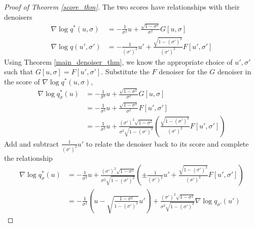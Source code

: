 \documentclass[11pt]{article}
\theoremstyle{proposition}
\theoremstyle{lemma}
\theoremstyle{corollary}
\theoremstyle{theorem}
\theoremstyle{definition}
\begin{document}
\begin{proof}[Proof of Theorem \ref{score_thm}]
The two scores have relationships with their denoisers
\begin{align*}
\nabla \log q^{*}(u,\sigma)&= - \frac{1}{\sigma^{2}}u+\frac{\sqrt{1-\sigma^{2}}}{\sigma^{2}}G[u,\sigma]\\
\nabla \log q(u',\sigma')&= - \frac{1}{(\sigma')^{2}}u'+\frac{\sqrt{1-(\sigma')^{2}}}{(\sigma')^{2}}F[u',\sigma']
\end{align*}
Using Theorem \ref{main_denoiser_thm}, we know the appropriate choice of $u',\sigma'$ such that $G[u,\sigma] = F[u',\sigma']$. Substitute the $F$ denoiser for the $G$ denoiser in the score of $\nabla \log q^{*}(u,\sigma)$,
\begin{align*}
\nabla \log q^{*}_{\sigma}(u)&= -\frac{1}{\sigma^{2}}u+\frac{\sqrt{1-\sigma^{2}}}{\sigma^{2}}G[u,\sigma]\\
&= -\frac{1}{\sigma^{2}}u+\frac{\sqrt{1-\sigma^{2}}}{\sigma^{2}}F[u',\sigma']\\
&= -\frac{1}{\sigma^{2}}u+\frac{(\sigma')^{2}\sqrt{1-\sigma^{2}}}{\sigma^{2}\sqrt{1-(\sigma')^{2}}}\left(\frac{\sqrt{1-(\sigma')^{2}}}{(\sigma')^{2}}F[u',\sigma'] \right)
\end{align*}
Add and subtract $\frac{1}{(\sigma')^{2}}u'$ to relate the denoiser back to its score and complete the relationship
\begin{align*}
\nabla \log q^{*}_{\sigma}(u)&= -\frac{1}{\sigma^{2}}u+\frac{(\sigma')^{2}\sqrt{1-\sigma^{2}}}{\sigma^{2}\sqrt{1-(\sigma')^{2}}}(\pm\frac{1}{(\sigma')^{2}}u'+\frac{\sqrt{1-(\sigma')^{2}}}{(\sigma')^{2}}F[u',\sigma'])\\
&= -\frac{1}{\sigma^{2}}(u- \sqrt{\frac{1-\sigma^{2}}{1-(\sigma')^{2}}}u')+\frac{(\sigma')^{2}\sqrt{1-\sigma^{2}}}{\sigma^{2}\sqrt{1-(\sigma')^{2}}}\nabla \log q_{\sigma'}(u')
\end{align*}

\end{proof}
\end{document}
